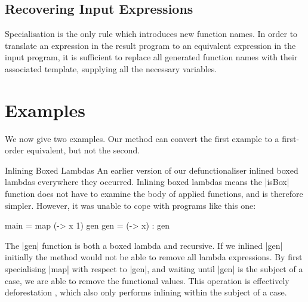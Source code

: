 \documentclass[preprint]{sigplanconf}
\begin{document}
\subsection{Recovering Input Expressions}

Specialisation is the only rule which introduces new function names. In order to translate an expression in the result program to an equivalent expression in the input program, it is sufficient to replace all generated function names with their associated template, supplying all the necessary variables.

\section{Examples}
\label{sec:examples}

We now give two examples. Our method can convert the first example to a first-order equivalent, but not the second.

\begin{examplename}{Inlining Boxed Lambdas}
\label{ex:inlining_boxed_lambdas}
An earlier version of our defunctionaliser inlined boxed lambdas everywhere they occurred. Inlining boxed lambdas means the |isBox| function does not have to examine the body of applied functions, and is therefore simpler. However, it was unable to cope with programs like this one:

\begin{code}
main = map (\x -> x 1) gen
gen = (\x -> x) : gen
\end{code}

The |gen| function is both a boxed lambda and recursive. If we inlined |gen| initially the method would not be able to remove all lambda expressions. By first specialising |map| with respect to |gen|, and waiting until |gen| is the subject of a case, we are able to remove the functional values. This operation is effectively deforestation \cite{wadler:deforestation}, which also only performs inlining within the subject of a case.
\end{examplename}
\end{document}
